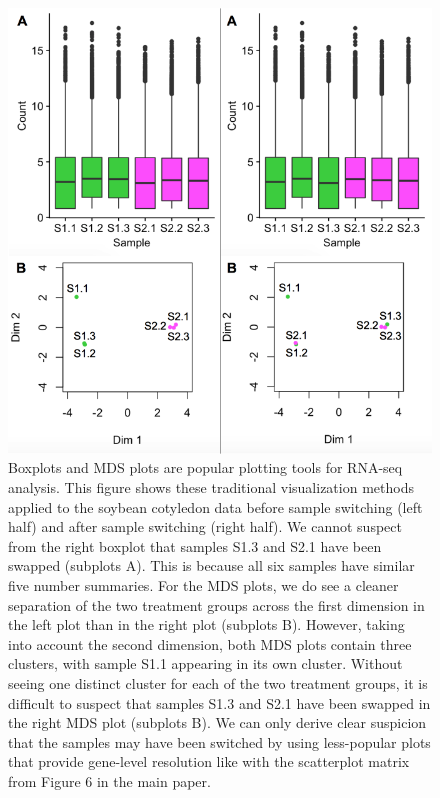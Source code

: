 \documentclass{article}
\begin{document}
  \clearpage
  \null
  \begin{figure}[!t]
  \centerline{\includegraphics[width=0.7\columnwidth]{SupplementaryFigure2Dots.png}}
  \caption{Boxplots and MDS plots are popular plotting tools for RNA-seq analysis. This figure shows these traditional visualization methods applied to the soybean cotyledon data before sample switching (left half) and after sample switching (right half). We cannot suspect from the right boxplot that samples S1.3 and S2.1 have been swapped (subplots A). This is because all six samples have similar five number summaries. For the MDS plots, we do see a cleaner separation of the two treatment groups across the first dimension in the left plot than in the right plot (subplots B). However, taking into account the second dimension, both MDS plots contain three clusters, with sample S1.1 appearing in its own cluster. Without seeing one distinct cluster for each of the two treatment groups, it is difficult to suspect that samples S1.3 and S2.1 have been swapped in the right MDS plot (subplots B). We can only derive clear suspicion that the samples may have been switched by using less-popular plots that provide gene-level resolution like with the scatterplot matrix from Figure 6 in the main paper.
  \label{mdsSwitch}}
  \end{figure}
  
\end{document}

